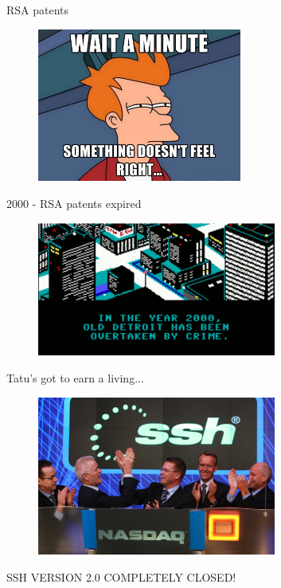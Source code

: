 \documentclass[10pt, compress, aspectratio=169]{beamer}
\begin{document}
\begin{frame}{RSA patents}
  \begin{figure}[ht]
    \centering
    \includegraphics[width=0.6\textwidth, keepaspectratio=true]{images/wait.jpg}
  \end{figure}
\end{frame}

\begin{frame}{2000 - RSA patents expired}
  \begin{figure}[ht]
    \centering
    \includegraphics[width=0.7\textwidth, keepaspectratio=true]{images/2000.png}
  \end{figure}
\end{frame}

\begin{frame}{Tatu's got to earn a living...}
  \pause
  \begin{figure}[ht]
    \centering
    \includegraphics[width=0.7\textwidth, keepaspectratio=true]{images/ssh.jpg}
  \end{figure}
  \pause
  SSH VERSION 2.0 COMPLETELY CLOSED!
\end{frame}
\end{document}
